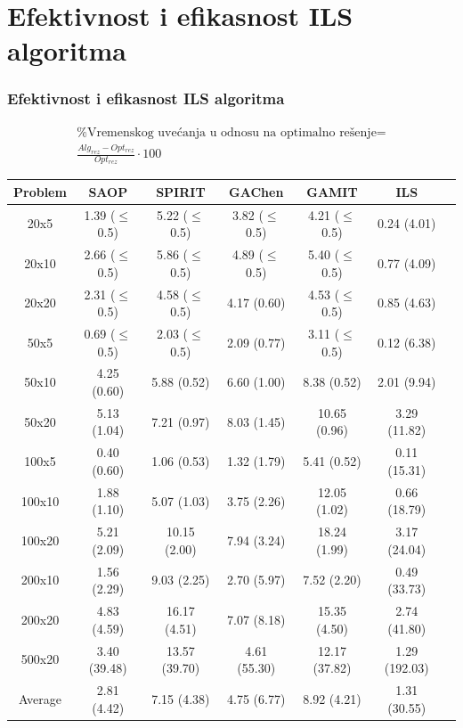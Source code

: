 \documentclass{beamer}
\begin{document}
\section{Efektivnost i efikasnost ILS algoritma}
\begin{frame}[fragile]\frametitle{Efektivnost i efikasnost ILS algoritma}

\begin{gather*}
\textrm{\% Vremenskog uvećanja u odnosu na optimalno rešenje} = \\\frac{Alg_{rez} - Opt_{rez}}{Opt_{rez}} \cdot100
\end{gather*}
\begin{table}[H]
  \label{tab:alg}
  \begin{center}
      \begin{adjustbox}{max width=0.5\linewidth,center}
   \begin{tabular}{c c c c c c c} 
   \hline
   Problem & SAOP & SPIRIT & GAChen & GAMIT & ILS &\\ [0.5ex] 
   \hline\hline
   20x5 & 1.39 ($\leq$0.5) & 5.22 ($\leq$0.5) & 3.82 ($\leq$0.5) & 4.21 ($\leq$0.5) & 0.24 (4.01) &\\ [1ex]
   \hline
   20x10 & 2.66 ($\leq$0.5) & 5.86 ($\leq$0.5) & 4.89 ($\leq$0.5) & 5.40 ($\leq$0.5) & 0.77 (4.09) &\\ [1ex]
   \hline
   20x20 & 2.31 ($\leq$0.5) & 4.58 ($\leq$0.5) & 4.17 (0.60) & 4.53 ($\leq$0.5) & 0.85 (4.63) &\\ [1ex]
   \hline
   50x5 & 0.69 ($\leq$0.5) & 2.03 ($\leq$0.5) & 2.09 (0.77) & 3.11 ($\leq$0.5) & 0.12 (6.38) &\\ [1ex]
   \hline
   50x10 & 4.25 (0.60) & 5.88 (0.52) & 6.60 (1.00) & 8.38 (0.52) & 2.01 (9.94) &\\ [1ex] 
   \hline
   50x20 & 5.13 (1.04) & 7.21 (0.97) & 8.03 (1.45) & 10.65 (0.96) & 3.29 (11.82) &\\ [1ex] 
   \hline
   100x5 & 0.40 (0.60) & 1.06 (0.53) & 1.32 (1.79) & 5.41 (0.52) & 0.11 (15.31) &\\ [1ex] 
   \hline
   100x10 & 1.88 (1.10) & 5.07 (1.03) & 3.75 (2.26) & 12.05 (1.02) & 0.66 (18.79) &\\ [1ex] 
   \hline
   100x20 & 5.21 (2.09) & 10.15 (2.00) & 7.94 (3.24) &18.24 (1.99) & 3.17 (24.04) &\\ [1ex] 
   \hline
   200x10 & 1.56 (2.29) & 9.03 (2.25) & 2.70 (5.97) & 7.52 (2.20) & 0.49 (33.73) &\\ [1ex] 
   \hline
   200x20 & 4.83 (4.59) & 16.17 (4.51) & 7.07 (8.18) & 15.35 (4.50) & 2.74 (41.80) &\\ [1ex] 
   \hline
   500x20 & 3.40 (39.48) & 13.57 (39.70) & 4.61 (55.30) & 12.17 (37.82) & 1.29 (192.03) &\\ [1ex] 
   \hline
   \hline
   Average & 2.81 (4.42) & 7.15 (4.38) & 4.75 (6.77) & 8.92 (4.21) & 1.31 (30.55) &\\ [1ex] 
   \end{tabular}
  \end{adjustbox}
  \end{center}
  \end{table}
\end{frame}
\end{document}
